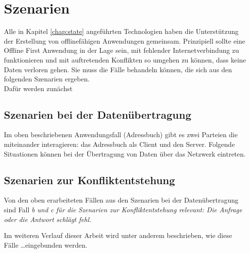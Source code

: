 \chapter{\label{chap:szenarien}Szenarien}
Alle in Kapitel \ref{chap:state} angeführten Technologien haben die Unterstützung der Erstellung von offlinefähigen Anwendungen gemeinsam.
Prinzipiell sollte eine Offline First Anwendung in der Lage sein, mit fehlender Internetverbindung zu funktionieren und mit auftretenden Konflikten so umgehen zu können, dass keine Daten verloren gehen. Sie muss die Fälle behandeln können, die sich aus den folgenden Szenarien ergeben.\\
Dafür werden zunächst
%
%
\section{\label{sec:netszenarien}Szenarien bei der Datenübertragung}
Im oben beschriebenen Anwendungsfall (Adressbuch) gibt es zwei Parteien die miteinander interagieren: das Adressbuch als Client und den Server. Folgende Situationen können bei der Übertragung von Daten über das Netzwerk eintreten.

%
%
\section{\label{sec:konfliktszenarien}Szenarien zur Konfliktentstehung}
Von den oben erarbeiteten Fällen aus den Szenarien bei der Datenübertragung sind Fall \it{b} und \it{c} für die Szenarien zur Konfliktentstehung relevant: Die Anfrage oder die Antwort schlägt fehl.

%
Im weiteren Verlauf dieser Arbeit wird unter anderem beschrieben, wie diese Fälle \ldots  eingebunden werden.